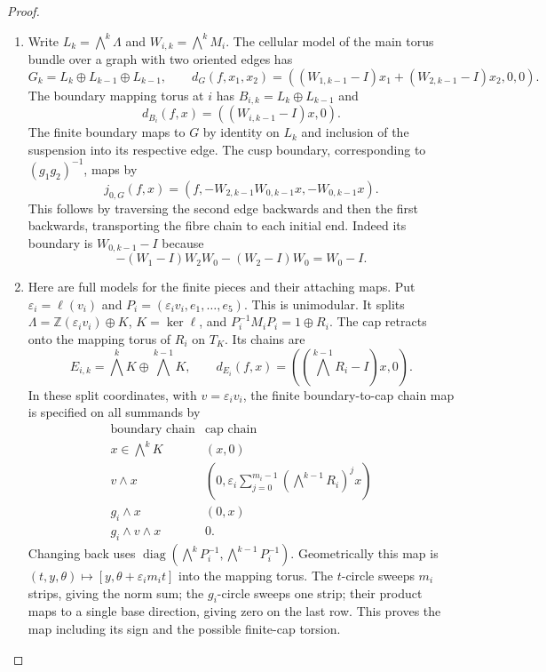 \documentclass[11pt,a4paper]{article}
\theoremstyle{definition}
\begin{document}
\begin{proof}
\begin{enumerate}[label=\arabic*.]
\item Write $L_k=\bigwedge^k\Lambda$ and $W_{i,k}=\bigwedge^kM_i$.
The cellular model of the main torus bundle over a graph with two
oriented edges has
\[
G_k=L_k\oplus L_{k-1}\oplus L_{k-1},\qquad
d_G(f,x_1,x_2)=((W_{1,k-1}-I)x_1+(W_{2,k-1}-I)x_2,0,0).
\tag{1.12.1}
\]
The boundary mapping torus at $i$ has
$B_{i,k}=L_k\oplus L_{k-1}$ and
\[
d_{B_i}(f,x)=((W_{i,k-1}-I)x,0).
\tag{1.12.2}
\]
The finite boundary maps to $G$ by identity on $L_k$ and inclusion
of the suspension into its respective edge.  The cusp boundary,
corresponding to $(g_1g_2)^{-1}$, maps by
\[
j_{0,G}(f,x)=(f,-W_{2,k-1}W_{0,k-1}x,-W_{0,k-1}x).
\tag{1.12.3}
\]
This follows by traversing the second edge backwards and then the
first backwards, transporting the fibre chain to each initial end.
Indeed its boundary is $W_{0,k-1}-I$ because
\[
-(W_1-I)W_2W_0-(W_2-I)W_0=W_0-I.
\]

\item Here are full models for the finite pieces and their attaching maps.
Put $\varepsilon_i=\ell(v_i)$ and
$P_i=(\varepsilon_iv_i,e_1,\ldots,e_5)$.
This is unimodular.  It splits
$\Lambda=\mathbb Z(\varepsilon_iv_i)\oplus K$, $K=\ker\ell$,
and $P_i^{-1}M_iP_i=1\oplus R_i$.
The cap retracts onto the mapping torus of $R_i$ on $T_K$.
Its chains are
\[
E_{i,k}=\bigwedge^kK\oplus\bigwedge^{k-1}K,
\qquad d_{E_i}(f,x)=((\bigwedge^{k-1}R_i-I)x,0).
\tag{1.12.4}
\]
In these split coordinates, with $v=\varepsilon_iv_i$, the finite
boundary-to-cap chain map is specified on all summands by
\[
\begin{array}{c|c}
\text{boundary chain}&\text{cap chain}\\\hline
x\in\bigwedge^kK&(x,0)\\
v\wedge x&(0,\varepsilon_i\sum_{j=0}^{m_i-1}
                  (\bigwedge^{k-1}R_i)^jx)\\
g_i\wedge x&(0,x)\\
g_i\wedge v\wedge x&0.
\end{array}
\tag{1.12.5}
\]
Changing back uses
$\operatorname{diag}(\bigwedge^kP_i^{-1},
\bigwedge^{k-1}P_i^{-1})$.
Geometrically this map is
$(t,y,\theta)\mapsto[y,\theta+\varepsilon_im_it]$ into the mapping
torus.  The $t$-circle sweeps $m_i$ strips, giving the norm sum; the
$g_i$-circle sweeps one strip; their product maps to a single
base direction, giving zero on the last row.  This proves the map
including its sign and the possible finite-cap torsion.


\end{enumerate}
\end{proof}
\end{document}
